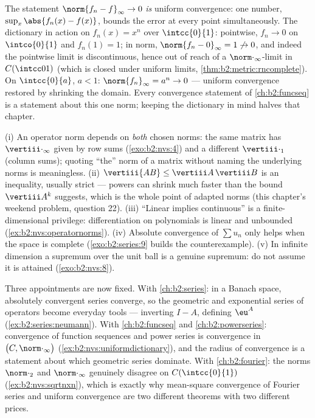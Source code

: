 \begin{example}\label{ex:b2:nvs:uniformdictionary}
The statement $\norm{f_n - f}_\infty \to 0$ \emph{is} uniform
convergence: one number, $\sup_x\abs{f_n(x) - f(x)}$, bounds
the error at every point simultaneously. The dictionary in
action on $f_n(x) = x^n$ over $\intcc{0}{1}$: pointwise, $f_n
\to 0$ on $\intco{0}{1}$ and $f_n(1) = 1$; in norm,
$\norm{f_n - 0}_\infty = 1 \not\to 0$, and indeed the pointwise
limit is discontinuous, hence out of reach of a
$\norm\cdot_\infty$-limit in $C(\intcc01)$ (which is closed
under uniform limits, \cref{thm:b2:metric:rncomplete}). On
$\intcc{0}{a}$, $a < 1$: $\norm{f_n}_\infty = a^n \to 0$ ---
uniform convergence restored by shrinking the domain. Every
convergence statement of \cref{ch:b2:funcseq} is a statement
about this one norm; keeping the dictionary in mind halves
that chapter.
\end{example}

\begin{remark}\label{rem:b2:nvs:pitfalls}
(i) An operator norm depends on \emph{both} chosen norms: the
same matrix has $\vertiii\cdot_\infty$ given by row sums
(\cref{exo:b2:nvs:4}) and a different $\vertiii\cdot_1$ (column
sums); quoting ``the'' norm of a matrix without naming the
underlying norms is meaningless. (ii) $\vertiii{AB} \leq
\vertiii A\,\vertiii B$ is an inequality, usually strict ---
powers can shrink much faster than the bound $\vertiii A^k$
suggests, which is the whole point of adapted norms (this
chapter's weekend problem, question 22). (iii) ``Linear implies
continuous'' is a finite-dimensional privilege: differentiation
on polynomials is linear and unbounded
(\cref{ex:b2:nvs:operatornorms}). (iv) Absolute convergence of
$\sum u_n$ only helps when the space is complete
(\cref{exo:b2:series:9} builds the counterexample). (v) In
infinite dimension a supremum over the unit ball is a genuine
supremum: do not assume it is attained
(\cref{exo:b2:nvs:8}).
\end{remark}

\begin{remark}\label{rem:b2:nvs:perspectives}
Three appointments are now fixed. With \cref{ch:b2:series}: in
a Banach space, absolutely convergent series converge, so the
geometric and exponential series of operators become everyday
tools --- inverting $I - A$, defining $\eu^{A}$
(\cref{ex:b2:series:neumann}). With
\cref{ch:b2:funcseq} and \cref{ch:b2:powerseries}: convergence
of function sequences and power series is convergence in
$\bigl(C, \norm\cdot_\infty\bigr)$
(\cref{ex:b2:nvs:uniformdictionary}), and the radius of
convergence is a statement about which geometric series
dominate. With \cref{ch:b2:fourier}: the norms
$\norm\cdot_2$ and $\norm\cdot_\infty$ genuinely disagree on
$C(\intcc{0}{1})$ (\cref{ex:b2:nvs:sqrtnxn}), which is exactly
why mean-square convergence of Fourier series and uniform
convergence are two different theorems with two different
prices.
\end{remark}

